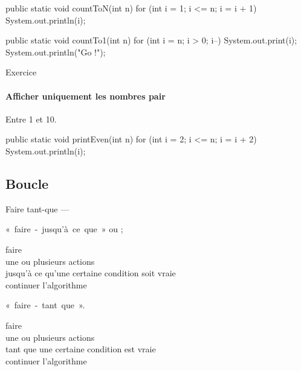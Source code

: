 \begin{hideedit}
\begin{frame}[fragile]
    \begin{java}
public static void countToN(int n) {
    for (int i = 1; i <= n; i = i + 1) {
        System.out.println(i);
    }
}
    \end{java}
\end{frame}

\begin{frame}[fragile]
\begin{java}
public static void countTo1(int n) {
    for (int i = n; i > 0; i--) {
        System.out.print(i);
    }
    System.out.println("Go !");
}
\end{java}
\end{frame}

\begin{frame}[fragile]{Exercice}
  \framesubtitle{Afficher uniquement les nombres pair}
  Entre 1 et 10.

  \pause
  \begin{java}
public static void printEven(int n) {
    for (int i = 2; i <= n; i = i + 2) {
        System.out.println(i);
    }
}
  \end{java}
\end{frame}

\subsection{Boucle }
\begin{frame}{\og Faire tant-que \og --- }

  «~faire~-~jusqu'à~ce~que~» ou ;
  \begin{langagenaturel}
    faire\\
      \tab une ou plusieurs actions\\
    jusqu'à ce qu'une certaine condition soit vraie\\
    continuer l'algorithme 
  \end{langagenaturel}

  «~faire~-~tant~que~».
  \begin{langagenaturel}
    faire\\
      \tab une ou plusieurs actions\\
    tant que une certaine condition est vraie\\
    continuer l'algorithme 
  \end{langagenaturel}
\end{frame}


\end{hideedit}
